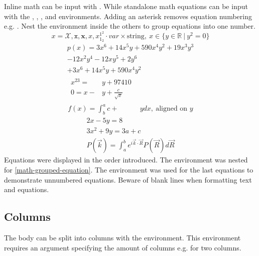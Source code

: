 Inline math can be input with .
While standalone math equations can be input with the
, , , and  environments.
Adding an asterisk removes equation numbering e.g. .
Nest the  environment inside the others to group equations into one number.
\begin{equation}
    x = \mathcal{X}, \mathtt{x}, \mathbf{x}, \mathit{x},
        x_{1_{2}}^{1^{2}}
    \cdot var \times \text{string}
    ,~x \in \{y \in \mathbb{R}~|~y^2 = 0\}
\end{equation}
\begin{multline}
    p(x) = 3x^6 + 14x^5y + 590x^4y^2 + 19x^3y^3\\
        - 12x^2y^4 - 12xy^5 + 2y^6\\
        + 3x^6 + 14x^5y + 590x^4y^2
\end{multline}
\begin{align}
    \begin{split}
        \label{math-grouped-equation}
        x^{23} = ~&y + 97410\\
        0 = x - &y + \frac{c}{\sqrt{x}}
    \end{split}\\
    f(x) = \int_b^a c + &y dx, ~\text{aligned on } y
\end{align}
\begin{gather*}
    2x - 5y =  8 \\
    3x^2 + 9y =  3a + c \\
    P(\vec{k}) = \int_a^b e^{i\vec{k}\cdot\vec{R}} P(\vec{R}) d\vec{R}
\end{gather*}
Equations were displayed in the order introduced.
The  environment was nested for \cref{math-grouped-equation}.
The  environment was used for the last equations
to demonstrate unnumbered equations.
Beware of blank lines when formatting text and equations.


\subsection{Columns}
The body can be split into columns with the  environment.
This environment requires an argument specifying the amount of columns e.g.
 for two columns.

